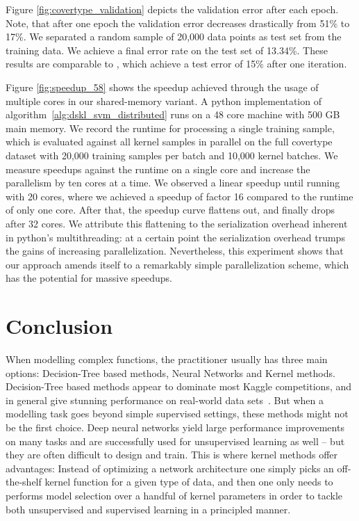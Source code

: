 \documentclass{article} %
\begin{document}
Figure \ref{fig:covertype_validation} depicts the validation error after each epoch. Note, that after one epoch the validation error decreases drastically from 51\% to 17\%. We separated a random sample of 20,000 data points as test set from the training data. We achieve a final error rate on the test set of 13.34\%. 
These results are comparable to \cite{Dai2014}, which achieve a test error of 15\% after one iteration. 

Figure \ref{fig:speedup_58} shows the speedup achieved through the usage of multiple cores in our shared-memory variant. A python implementation of algorithm~\autoref{alg:dskl_svm_distributed} runs on a 48 core machine with 500 GB main memory. We record the runtime for processing a single training sample, which is evaluated against all kernel samples in parallel on the full covertype dataset with 20,000 training samples per batch and 10,000 kernel batches. We measure speedups against the runtime on a single core and increase the parallelism by ten cores at a time. We observed a linear speedup until running with 20 cores, where we achieved a speedup of factor 16 compared to the runtime of only one core. After that, the speedup curve flattens out, and finally drops after 32 cores. We attribute this flattening to the serialization overhead inherent in python's multithreading: at a certain point the serialization overhead trumps the gains of increasing parallelization. Nevertheless, this experiment shows that our approach amends itself to a remarkably simple parallelization scheme, which has the potential for massive speedups.

\section{Conclusion}
When modelling complex functions, the practitioner usually has three main options: Decision-Tree based methods, Neural Networks and Kernel methods. Decision-Tree based methods appear to dominate most Kaggle competitions, and in general give stunning performance on real-world data sets~\cite{Caruana2006}. But when a modelling task goes beyond simple supervised settings, these methods might not be the first choice. Deep neural networks yield large performance improvements on many tasks and are successfully used for unsupervised learning as well -- but they are often difficult to design and train. 
This is where kernel methods offer advantages: Instead of optimizing a network architecture one simply picks an off-the-shelf kernel function for a given type of data, and then one only needs to performs model selection over a handful of kernel parameters in order to tackle both unsupervised and supervised learning in a principled manner.
\end{document}
